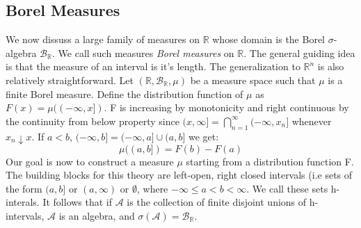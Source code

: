 \documentclass{article}
\begin{document}
\subsection{Borel Measures}
We now dissuss a large family of measures on $\mathbb{R}$ whose domain is the Borel $\sigma$-algebra $\mathcal{B}_{\mathbb{R}}$. We call such measures \emph{Borel measures} on $\mathbb{R}$. The general guiding idea is that the measure of an interval is it's length. The generalization to $\mathbb{R}^n$ is also relatively straightforward. \newline \newline
Let $(\mathbb{R},\mathcal{B}_{\mathbb{R}}, \mu)$ be a measure space such that $\mu$ is a finite Borel measure. Define the distribution function of $\mu$ as $F(x) = \mu((-\infty,x])$. F is increasing by monotonicity and right continuous by the continuity from below property since $(x, \infty] = \bigcap_{n=1}^{\infty}(-\infty,x_n]$ whenever $x_n\downarrow x$.\newline \newline
If $a<b$, $(-\infty,b] =(-\infty,a] \cup (a,b]$ we get: 
\[
\mu((a,b])= F(b) - F(a)
\]
Our goal is now to construct a measure $\mu$ starting from a distribution function F. \newline \newline
The building blocks for this theory are left-open, right closed intervals (i.e sets of the form $(a,b]$ or $(a,\infty)$ or $\emptyset$, where $-\infty\leq a<b<\infty$. We call these sets h-interals. It follows that if $\mathcal{A}$ is the collection of finite disjoint unions of h-intervals, $\mathcal{A}$ is an algebra, and $\sigma(\mathcal{A})= \mathcal{B}_{\mathbb{R}}$.
\end{document}
